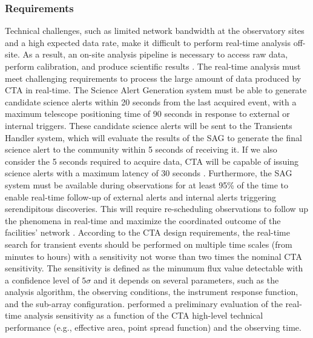 \subsubsection{Requirements}
\label{ss:sag-requirements}
Technical challenges, such as limited network bandwidth at the observatory sites and a high expected data rate, make it difficult to perform real-time analysis off-site. As a result, an on-site analysis pipeline is necessary to access raw data, perform calibration, and produce scientific results \cite{bulgarelli2015on}. The real-time analysis must meet challenging requirements to process the large amount of data produced by CTA in real-time. The Science Alert Generation system must be able to generate candidate science alerts within 20 seconds from the last acquired event, with a maximum telescope positioning time of 90 seconds in response to external or internal triggers. These candidate science alerts will be sent to the Transients Handler system, which will evaluate the results of the SAG to generate the final science alert to the community within 5 seconds of receiving it. If we also consider the 5 seconds required to acquire data, CTA will be capable of issuing science alerts with a maximum latency of 30 seconds \cite{Bulgarelli_2021}.
Furthermore, the SAG system must be available during observations for at least 95\% of the time to enable real-time follow-up of external alerts and internal alerts triggering serendipitous discoveries. This will require re-scheduling observations to follow up the phenomena in real-time and maximize the coordinated outcome of the facilities' network \cite{di2020detection}. According to the CTA design requirements, the real-time search for transient events should be performed on multiple time scales (from minutes to hours) with a sensitivity not worse than two times the nominal CTA sensitivity. The sensitivity is defined as the minumum flux value detectable with a confidence level of $5\sigma$ and it depends on several parameters, such as the analysis algorithm, the observing conditions, the instrument response function, and the sub-array configuration.
\cite{fioretti2015real} performed a preliminary evaluation of the real-time analysis sensitivity as a function of the CTA high-level technical performance (e.g., effective area, point spread function) and the observing time. 
 
